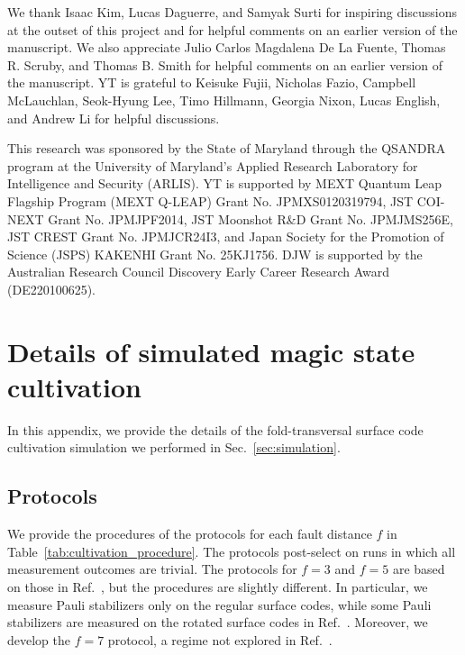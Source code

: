 \documentclass[
 reprint,
 amsmath,amssymb,
 pra,superscriptaddress, nofootinbib
]{revtex4-2}
\theoremstyle{definition}
\theoremstyle{plain}
\begin{document}
\begin{acknowledgements}
We thank Isaac Kim, Lucas Daguerre, and Samyak Surti for inspiring discussions at the outset of this project and for helpful comments on an earlier version of the manuscript. 
We also appreciate Julio Carlos Magdalena De La Fuente, Thomas R. Scruby, and Thomas B. Smith for helpful comments on an earlier version of the manuscript.
YT is grateful to Keisuke Fujii, Nicholas Fazio, Campbell McLauchlan, Seok-Hyung Lee, Timo Hillmann, Georgia Nixon, Lucas English, and Andrew Li for helpful discussions.

This research was sponsored by the State of Maryland through the QSANDRA program at the University of Maryland’s Applied Research Laboratory for Intelligence and Security (ARLIS).
YT is supported by MEXT Quantum Leap Flagship Program (MEXT Q-LEAP) Grant No. JPMXS0120319794, JST COI-NEXT Grant No. JPMJPF2014, JST Moonshot R\&D Grant No. JPMJMS256E, JST CREST Grant No. JPMJCR24I3, and Japan Society for the Promotion of Science (JSPS) KAKENHI Grant No. 25KJ1756.
DJW is supported by the Australian Research Council Discovery Early Career Research Award (DE220100625).
\end{acknowledgements}



\newpage

\appendix

\section{Details of simulated magic state cultivation}
\label{app:cultivation}
In this appendix, we provide the details of the fold-transversal surface code cultivation simulation we performed in Sec.~\ref{sec:simulation}.

\subsection{Protocols}
\label{app_subsec:cultivation_protocol}
We provide the procedures of the protocols for each fault distance $f$ in Table~\ref{tab:cultivation_procedure}.
The protocols post-select on runs in which all measurement outcomes are trivial.
The protocols for $f=3$ and $f=5$ are based on those in Ref.~\cite{gpvl-lg4c}, but the procedures are slightly different. In particular, we measure Pauli stabilizers only on the regular surface codes, while some Pauli stabilizers are measured on the rotated surface codes in Ref.~\cite{gpvl-lg4c}. 
Moreover, we develop the $f=7$ protocol, a regime not explored in Ref.~\cite{gpvl-lg4c}.
\end{document}
